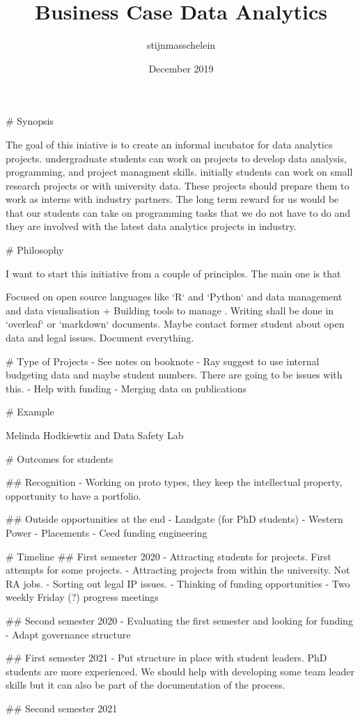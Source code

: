 \documentclass{article}
\title{Business Case Data Analytics}
\author{stijnmasschelein }
\date{December 2019}
\begin{document}
\begin{markdown}
# Synopsis

The goal of this iniative is to create an informal incubator for data analytics projects. undergraduate students can work on projects to develop data analysis, programming, and project managment skills. initially students can work on small research projects or with university data. These projects should prepare them to work as interns with industry partners. The long term reward for us would be that our students can take on programming tasks that we do not have to do and they are involved with the latest data analytics projects in industry. 


# Philosophy

I want to start this initiative from a couple of principles. The main one is that 

Focused on open source languages like `R` and `Python` and data management and data visualisation + Building tools to manage . Writing shall be done in `overleaf` or `markdown` documents. Maybe contact former student about open data and legal issues. Document everything.

# Type of Projects
- See notes on booknote
- Ray suggest to use internal budgeting data and maybe student numbers.     There are going to be issues with this. 
- Help with funding
- Merging data on publications 

# Example

Melinda Hodkiewtiz and Data Safety Lab

# Outcomes for students

## Recognition
- Working on proto types, they keep the intellectual property, opportunity to have a portfolio.

## Outside opportunities at the end 
- Landgate (for PhD students)
- Western Power
- Placements 
- Ceed funding engineering

# Timeline
## First semester 2020
- Attracting students for projects. First attempts for some projects.
- Attracting projects from within the university. Not RA jobs.
- Sorting out legal IP issues.
- Thinking of funding opportunities
- Two weekly Friday (?) progress meetings

## Second semester 2020
- Evaluating the first semester and looking for funding
- Adapt governance structure

## First semester 2021 
- Put structure in place with student leaders. PhD students are more        experienced. We should help with developing some team leader skills but it can also be part of the documentation of the process. 

## Second semester 2021 

\end{markdown}
\end{document}
